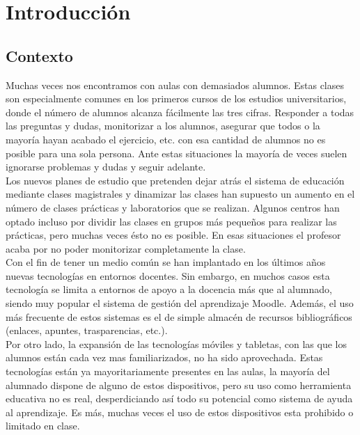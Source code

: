 
\pagestyle{fancy}

\chapter{Introducción}
\label{introduccion}

\section{Contexto}

Muchas veces nos encontramos con aulas con demasiados alumnos. Estas clases son especialmente comunes en los primeros cursos de los estudios universitarios, donde el número de alumnos alcanza fácilmente las tres cifras. Responder a todas las preguntas y dudas, monitorizar a los alumnos, asegurar que todos o la mayoría hayan acabado el ejercicio, etc. con esa cantidad de alumnos no es posible para una sola persona. Ante estas situaciones la mayoría de veces suelen ignorarse problemas y dudas y seguir adelante.\\

Los nuevos planes de estudio que pretenden dejar atrás el sistema de educación mediante clases magistrales y dinamizar las clases han supuesto un aumento en el número de clases prácticas y laboratorios que se realizan. Algunos centros han optado incluso por dividir las clases en grupos más pequeños para realizar las prácticas, pero muchas veces ésto no es posible. En esas situaciones el profesor acaba por no poder monitorizar completamente la clase.\\

Con el fin de tener un medio común se han implantado en los últimos años nuevas tecnologías en entornos docentes. Sin embargo, en muchos casos esta tecnología se limita a entornos de apoyo a la docencia más que al alumnado, siendo muy popular el sistema de gestión del aprendizaje Moodle. Además, el uso más frecuente de estos sistemas es el de simple almacén de recursos bibliográficos (enlaces, apuntes, trasparencias, etc.).\\

Por otro lado, la expansión de las tecnologías móviles y tabletas, con las que los alumnos están cada vez mas familiarizados, no ha sido aprovechada. Estas tecnologías están ya mayoritariamente presentes en las aulas, la mayoría del alumnado dispone de alguno de estos dispositivos, pero su uso como herramienta educativa no es real, desperdiciando así todo su potencial como sistema de ayuda al aprendizaje. Es más, muchas veces el uso de estos dispositivos esta prohibido o limitado en clase.\\

